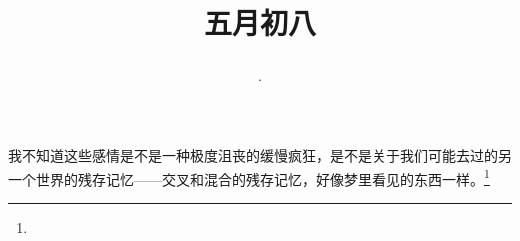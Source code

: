 \title{\date[d=13,m=6,y=2024][year:cn-y,年,month:cn,day:cn,日,·,weekday]·五月初八 }
我不知道这些感情是不是一种极度沮丧的缓慢疯狂，是不是关于我们可能去过的另一个世界的残存记忆——交叉和混合的残存记忆，好像梦里看见的东西一样。\footnote{ }

